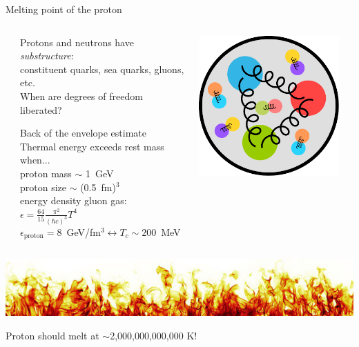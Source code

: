 \documentclass[xcolor=dvipsnames, aspectratio=169]{beamer}
\begin{document}
\usebackgroundtemplate{}

\begin{frame}[t]{Melting point of the proton}
    \bigskip
    \begin{columns}
        \begin{column}{0.05\textwidth}
        \end{column}
        \begin{column}{0.6\textwidth}
            Protons and neutrons have \emph{substructure}:\\
            constituent quarks, sea quarks, gluons, etc.\\
            When are degrees of freedom liberated?
            \begin{block}{Back of the envelope estimate}
                Thermal energy exceeds rest mass when...\\
                proton mass $\sim$ 1~GeV\\
                proton size $\sim$ (0.5~fm)$^3$\\
                energy density gluon gas: ~$\epsilon = \frac{64}{15} 
                \frac{\pi^2}{(\hbar c)^3} T^4$\\
                $\epsilon_\text{proton}=8$~GeV/fm$^3 \leftrightarrow 
                T_c \sim 200$~MeV\\[2ex]
            \end{block}
        \end{column}
        \begin{column}{0.3\textwidth}
            \centering
            \includegraphics[width=0.5\columnwidth]{proton}
        \end{column}
        \begin{column}{0.05\textwidth}
        \end{column}
    \end{columns}
    \hspace{5.6cm} \includegraphics[width=.35\textwidth]{fire}
    \vspace{-.2cm}
    \begin{tcolorbox}[colback=theme!10, colframe=theme!0]
        \centering \large Proton should melt at $\sim$2,000,000,000,000 K!
    \end{tcolorbox}
\end{frame}
\end{document}
